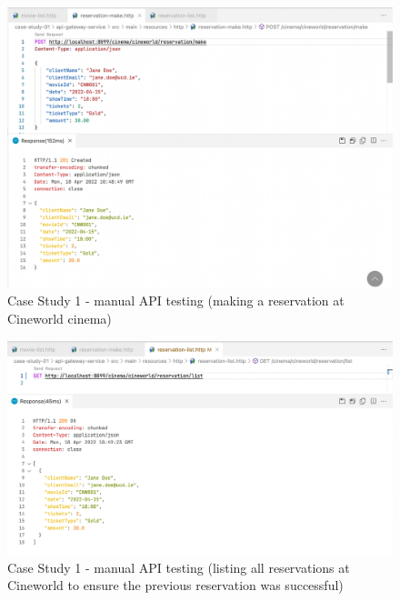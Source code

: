 \begin{figure}[H]
	\centering
	\includegraphics[width=1.0\linewidth]{./assets/images/case-studies/cs01-manual-2.png}
	\caption{Case Study 1 - manual API testing (making a reservation at Cineworld cinema)}
	\label{fig:cs01-manual-2}
\end{figure}

\begin{figure}[H]
	\centering
	\includegraphics[width=1.0\linewidth]{./assets/images/case-studies/cs01-manual-3.png}
	\caption{Case Study 1 - manual API testing (listing all reservations at Cineworld to ensure the previous reservation was successful)}
	\label{fig:cs01-manual-3}
\end{figure}


